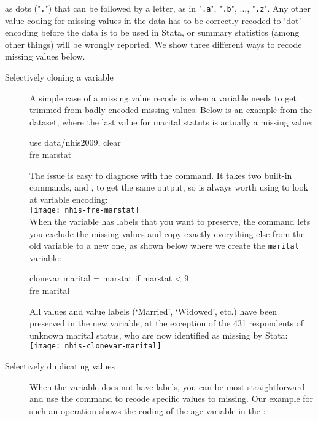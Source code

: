  as dots ("\texttt{.}") that can be followed by a letter, as in "\texttt{.a}", "\texttt{.b}", ..., "\texttt{.z}". Any other value coding for missing values in the data has to be correctly recoded to `dot' encoding before the data is to be used in Stata, or summary statistics (among other things) will be wrongly reported. We show three different ways to recode missing values below.

\begin{description}
	\item[Selectively cloning a variable]%
	A simple case of a missing value recode is when a variable needs to get trimmed from badly encoded missing values. Below is an example from the \NHIS dataset, where the last value for marital statuts is actually a missing value:

	\begin{docspec}
		use data/nhis2009, clear\\
		fre marstat
	\end{docspec}

	The issue is easy to diagnose with the  command. It takes two built-in commands,  and , to get the same output, so  is always worth using to look at variable encoding:\\[1em]

	\texttt{[image: nhis-fre-marstat]}\\[1em]

	When the variable has labels that you want to preserve, the  command lets you exclude the missing values and copy exactly everything else from the old variable to a new one, as shown below where we create the \texttt{marital} variable:

	\begin{docspec}
		clonevar marital = marstat if marstat < 9\\
		fre marital
	\end{docspec}

	All values and value labels (`Married', `Widowed', etc.) have been preserved in the new variable, at the exception of the 431 respondents of unknown marital status, who are now identified as missing by Stata:\\[1em]

	\texttt{[image: nhis-clonevar-marital]}\\[1em]

	\item[Selectively duplicating values]%
	When the variable does not have labels, you can be most straightforward and use the  command to recode specific values to missing. Our example for such an operation shows the coding of the age variable in the \wvs:


\end{description}
